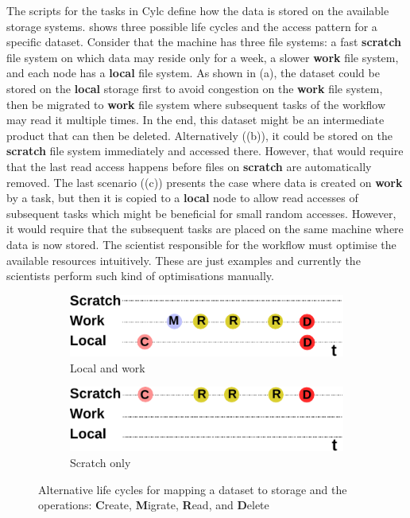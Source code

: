 \documentclass[a4paper]{article}
\begin{document}
The scripts for the tasks in Cylc define how the data is stored on the available storage systems.
 shows three possible life cycles and the access pattern for a specific dataset.
Consider that the machine has three file systems: a fast \textbf{scratch} file system on which data may reside only for a week, a slower \textbf{work} file system, and each node has a \textbf{local} file system.
As shown in (a), the dataset could be stored on the \textbf{local} storage first to avoid congestion on the \textbf{work} file system, then be migrated to \textbf{work} file system where subsequent tasks of the workflow may read it multiple times.
In the end, this dataset might be an intermediate product that can then be deleted.
Alternatively ((b)), it could be stored on the \textbf{scratch} file system immediately and accessed there.
However, that would require that the last read access happens before files on \textbf{scratch} are automatically removed.
The last scenario ((c)) presents the case where data is created on \textbf{work} by a task, but then it is copied to a \textbf{local} node to allow read accesses of subsequent tasks which might be beneficial for small random accesses.
However, it would require that the subsequent tasks are placed on the same machine where data is now stored.
The scientist responsible for the workflow must optimise the available resources intuitively.
These are just examples and currently the scientists perform such kind of optimisations manually.


\begin{figure}[tb]
  \centering
  \begin{subfigure}{.49\textwidth}
  \includegraphics[width=\columnwidth]{lifecycle-1}
  \caption{Local and work}
  \end{subfigure}
  \begin{subfigure}{.49\textwidth}
  \includegraphics[width=\columnwidth]{lifecycle-2}
  \caption{Scratch only}
  \end{subfigure}


  \caption{Alternative life cycles for mapping a dataset to storage and the operations: \textbf{C}reate, \textbf{M}igrate, \textbf{R}ead, and \textbf{D}elete}
  \label{fig:lifecycle}
\end{figure}
\end{document}
